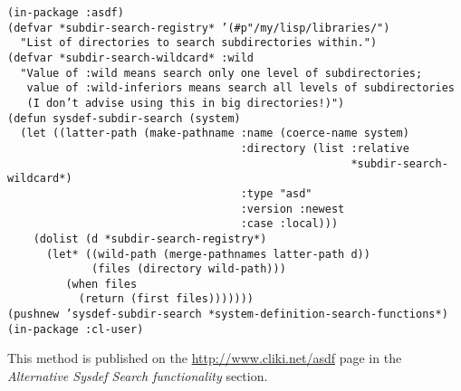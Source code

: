 \documentclass[11pt,a4paper,dvipdfm]{article}
\newcommand{\selfref}[1]{\href{#1}{#1}}
\newcommand{\prompttext}[1]{\texttt{#1}}
\begin{document}
\prompttext{(in-package :asdf) \\
(defvar *subdir-search-registry* '(\#p"/my/lisp/libraries/") \\
\mbox{~~}"List of directories to search subdirectories within.") \\
(defvar *subdir-search-wildcard* :wild \\
\mbox{~~}"Value of :wild means search only one level of subdirectories; \\
\mbox{~~~}value of :wild-inferiors means search all levels of subdirectories \\
\mbox{~~~}(I don't advise using this in big directories!)") \\
(defun sysdef-subdir-search (system) \\
\mbox{~~}(let ((latter-path (make-pathname :name (coerce-name system) \\
\mbox{~~~~~~~~~~~~~~~~~~~~~~~~~~~~~~~~~~~~}:directory (list :relative \\
\mbox{~~~~~~~~~~~~~~~~~~~~~~~~~~~~~~~~~~~~~~~~~~~~~~~~~~~~~}*subdir-search-wildcard*) \\
\mbox{~~~~~~~~~~~~~~~~~~~~~~~~~~~~~~~~~~~~}:type "asd" \\
\mbox{~~~~~~~~~~~~~~~~~~~~~~~~~~~~~~~~~~~~}:version :newest \\
\mbox{~~~~~~~~~~~~~~~~~~~~~~~~~~~~~~~~~~~~}:case :local))) \\
\mbox{~~~~}(dolist (d *subdir-search-registry*) \\
\mbox{~~~~~~}(let* ((wild-path (merge-pathnames latter-path d)) \\
\mbox{~~~~~~~~~~~~~}(files (directory wild-path))) \\
\mbox{~~~~~~~~~}(when files \\
\mbox{~~~~~~~~~~~}(return (first files))))))) \\
(pushnew 'sysdef-subdir-search *system-definition-search-functions*) \\
(in-package :cl-user)}

This method is published on the \selfref{http://www.cliki.net/asdf} page
in the \textsl{Alternative Sysdef Search functionality} section.
\end{document}
